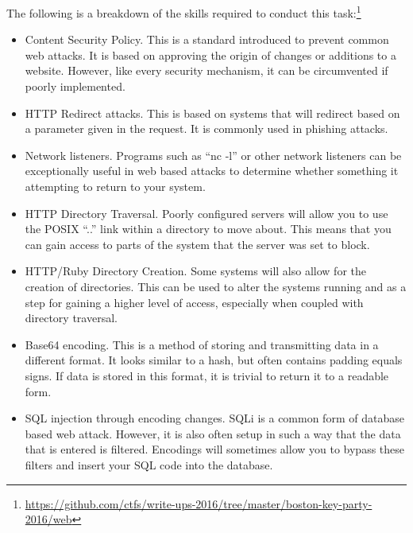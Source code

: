 \documentclass[a4paper,11pt]{report}
\begin{document}
			The following is a breakdown of the skills required to conduct this task:\footnote{\url{https://github.com/ctfs/write-ups-2016/tree/master/boston-key-party-2016/web}}
			\begin{itemize}
				\item Content Security Policy.
					This is a standard introduced to prevent common web attacks. 
					It is based on approving the origin of changes or additions to a website. 
					However, like every security mechanism, it can be circumvented if poorly implemented. 
				\item HTTP Redirect attacks. 
					This is based on systems that will redirect based on a parameter given in the request. 
					It is commonly used in phishing attacks. 
				\item Network listeners. 
					Programs such as ``nc -l'' or other network listeners can be exceptionally useful in web based attacks to determine whether something it attempting to return to your system. 
				\item HTTP Directory Traversal. 
					Poorly configured servers will allow you to use the POSIX ``..'' link within a directory to move about. 
					This means that you can gain access to parts of the system that the server was set to block. 
				\item HTTP/Ruby Directory Creation. 
					Some systems will also allow for the creation of directories. 
					This can be used to alter the systems running and as a step for gaining a higher level of access, especially when coupled with directory traversal. 
				\item Base64 encoding. 
					This is a method of storing and transmitting data in a different format. 
					It looks similar to a hash, but often contains padding equals signs. 
					If data is stored in this format, it is trivial to return it to a readable form. 
				\item SQL injection through encoding changes. 
					SQLi is a common form of database based web attack. 
					However, it is also often setup in such a way that the data that is entered is filtered. 
					Encodings will sometimes allow you to bypass these filters and insert your SQL code into the database. 
			\end{itemize}
\end{document}
